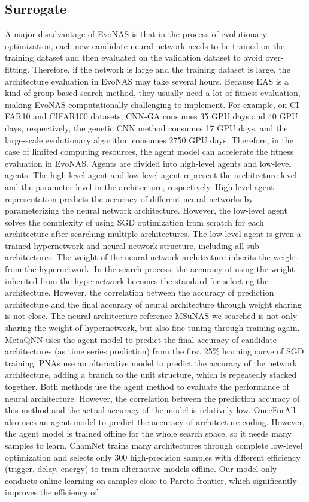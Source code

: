 \documentclass[lettersize,journal]{IEEEtran}
\begin{document}
\subsection{Surrogate}
A major disadvantage of EvoNAS is that in the process of evolutionary optimization, each new candidate neural network needs to be trained on the training dataset and then evaluated on the validation dataset to avoid over-fitting. Therefore, if the network is large and the training dataset is large, the architecture evaluation in EvoNAS may take several hours. Because EAS is a kind of group-based search method, they usually need a lot of fitness evaluation, making EvoNAS computationally challenging to implement. For example, on CI-FAR10 and CIFAR100 datasets, CNN-GA \cite{59} consumes 35 GPU days and 40 GPU days, respectively, the genetic CNN method \cite{60} consumes 17 GPU days, and the large-scale evolutionary algorithm \cite{61} consumes 2750 GPU days. Therefore, in the case of limited computing resources, the agent model can accelerate the fitness evaluation in EvoNAS. Agents are divided into high-level agents and low-level agents. The high-level agent and low-level agent represent the architecture level and the parameter level in the architecture, respectively. High-level agent representation predicts the accuracy of different neural networks by parameterizing the neural network architecture. However, the low-level agent solves the complexity of using SGD optimization from scratch for each architecture after searching multiple architectures. The low-level agent is given a trained hypernetwork and neural network structure, including all sub architectures. The weight of the neural network architecture inherits the weight from the hypernetwork. In the search process, the accuracy of using the weight inherited from the hypernetwork becomes the standard for selecting the architecture. However, the correlation between the accuracy of prediction architecture and the final accuracy of neural architecture through weight sharing is not close. The neural architecture reference MSuNAS \cite{62} we searched is not only sharing the weight of hypernetwork, but also fine-tuning through training again. MetaQNN \cite{63} uses the agent model to predict the final accuracy of candidate architectures (as time series prediction) from the first 25\% learning curve of SGD training. PNAs \cite{64} use an alternative model to predict the accuracy of the network architecture, adding a branch to the unit structure, which is repeatedly stacked together. Both methods use the agent method to evaluate the performance of neural architecture. However, the correlation between the prediction accuracy of this method and the actual accuracy of the model is relatively low. OnceForAll \cite{65} also uses an agent model to predict the accuracy of architecture coding. However, the agent model is trained offline for the whole search space, so it needs many samples to learn. ChamNet \cite{66} trains many architectures through complete low-level optimization and selects only 300 high-precision samples with different efficiency (trigger, delay, energy) to train alternative models offline. Our model only conducts online learning on samples close to Pareto frontier, which significantly improves the efficiency of 
\end{document}
